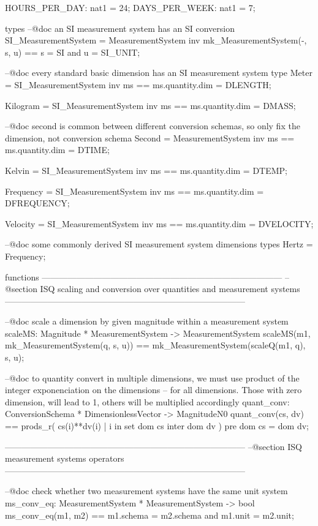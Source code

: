 \documentclass[a4paper]{article}
\begin{document}
\begin{vdm_al}
 HOURS_PER_DAY: nat1 = 24;
 DAYS_PER_WEEK: nat1 =  7;

types
 --@doc an SI measurement system has an SI conversion
 SI_MeasurementSystem = MeasurementSystem
 inv mk_MeasurementSystem(-, s, u) == s = SI and u = SI_UNIT;
        
 --@doc every standard basic dimension has an SI measurement system type
 Meter = SI_MeasurementSystem
 inv ms == ms.quantity.dim = DLENGTH;

 Kilogram = SI_MeasurementSystem
 inv ms == ms.quantity.dim = DMASS;

 --@doc second is common between different conversion schemas, so only fix the dimension, not conversion schema
 Second = MeasurementSystem
 inv ms == ms.quantity.dim = DTIME;
 
 Kelvin = SI_MeasurementSystem
 inv ms == ms.quantity.dim = DTEMP;
 
 Frequency = SI_MeasurementSystem
 inv ms == ms.quantity.dim = DFREQUENCY;

 Velocity = SI_MeasurementSystem
 inv ms == ms.quantity.dim = DVELOCITY;

 --@doc some commonly derived SI measurement system dimensions types
 Hertz = Frequency;

functions 
------------------------------------------------------------------------------------
--@section ISQ scaling and conversion over quantities and measurement systems
------------------------------------------------------------------------------------

 --@doc scale a dimension by given magnitude within a measurement system
 scaleMS: Magnitude * MeasurementSystem -> MeasurementSystem
 scaleMS(m1, mk_MeasurementSystem(q, s, u)) == mk_MeasurementSystem(scaleQ(m1, q), s, u);
 
 --@doc to quantity convert in multiple dimensions, we must use product of the integer exponenciation on the dimensions
 --     for all dimensions. Those with zero dimension, will lead to 1, others will be multiplied accordingly
 quant_conv: ConversionSchema * DimensionlessVector -> MagnitudeN0
 quant_conv(cs, dv) ==
  prods_r({ cs(i)**dv(i) | i in set dom cs inter dom dv })
 pre
  dom cs = dom dv;

------------------------------------------------------------------------------------
--@section ISQ measurement systems operators
------------------------------------------------------------------------------------
 
 --@doc check whether two measurement systems have the same unit system
 ms_conv_eq: MeasurementSystem * MeasurementSystem -> bool
 ms_conv_eq(m1, m2) == m1.schema = m2.schema and m1.unit = m2.unit;
  

\end{vdm_al}
\end{document}
